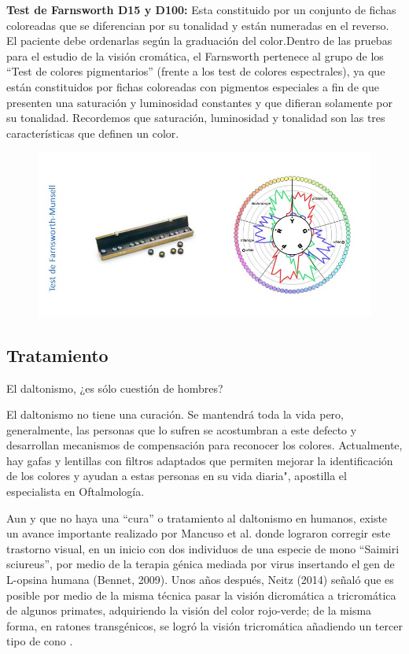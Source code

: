 \documentclass[10pt]{article}
\begin{document}
\textbf{Test de Farnsworth D15 y D100:} Esta constituido por un conjunto de fichas coloreadas que se diferencian por su tonalidad y están numeradas en el reverso. El paciente debe ordenarlas según la graduación del color.Dentro de las pruebas para el estudio de la visión cromática, el Farnsworth pertenece al grupo de los “Test de colores pigmentarios” (frente a los test de colores espectrales), ya que están constituidos por fichas coloreadas con pigmentos especiales a fin de que presenten una saturación y luminosidad constantes y que difieran solamente por su tonalidad. Recordemos que
saturación, luminosidad y tonalidad son las tres características que definen un color\cite{IEEEreferencias:Ref31}.

\begin{figure}[H]
	\begin{center}
\includegraphics[scale = 0.55]{Imagenes/fm.jpg}
	\end{center} 
\end{figure}

\subsection{Tratamiento}
El daltonismo, ¿es sólo cuestión de hombres?

El daltonismo no tiene una curación. Se mantendrá toda la vida pero, generalmente, las personas que lo sufren se acostumbran a este defecto y desarrollan mecanismos de compensación para reconocer los colores. Actualmente, hay gafas y lentillas con filtros adaptados que permiten mejorar la identificación de los colores y ayudan a estas personas en su vida diaria", apostilla el especialista en Oftalmología\cite{IEEEreferencias:Ref26}.

Aun y que no haya una “cura” o tratamiento al daltonismo en humanos, existe un avance importante realizado por Mancuso et al. donde lograron corregir este trastorno visual, en un inicio con dos individuos de una especie de mono “Saimiri sciureus”, por medio de la terapia génica mediada por virus insertando el gen de L-opsina humana (Bennet, 2009). Unos años después, Neitz (2014) señaló que es posible por medio de la misma técnica pasar la visión dicromática a tricromática de algunos primates, adquiriendo la visión del color rojo-verde; de la misma forma, en ratones transgénicos, se logró la visión tricromática añadiendo un tercer tipo de cono \cite{IEEEreferencias:Ref26}.
\end{document}
